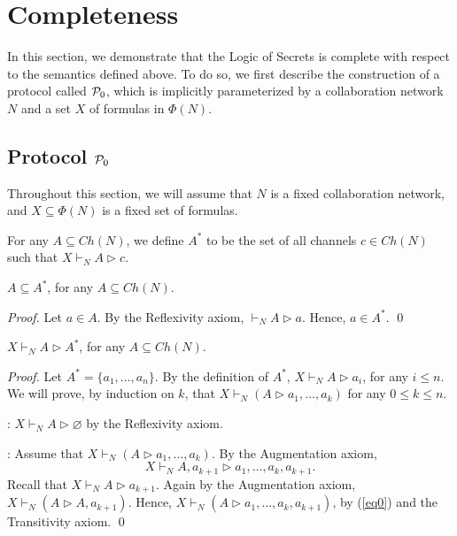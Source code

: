 \documentclass{llncs}
\newcommand{\pp}{{\cal P}}
\begin{document}
\section{Completeness}
In this section, we demonstrate that the Logic of Secrets is complete with respect to the semantics defined above.  To do so, we first describe the construction of a protocol called $\pp_0$, which is implicitly parameterized by a collaboration network $N$ and a set $X$ of formulas in $\Phi(N)$.


\subsection{Protocol $\pp_0$}
Throughout this section, we will assume that $N$ is a fixed collaboration network, and $X \subseteq \Phi(N)$ is a fixed set of formulas.

\begin{definition}\label{control closure}
For any $A\subseteq Ch(N)$, we define $A^*$ to be the set of all channels $c\in Ch(N)$ such that $X\vdash_N A\rhd c$.
\end{definition}



\begin{theorem}\label{AsubA*}
$A\subseteq A^*$, for any $A\subseteq Ch(N)$.
\end{theorem}
\begin{proof}
Let $a\in A$. By the Reflexivity axiom, $\vdash_N A\rhd a$. Hence, $a\in A^*$.
\qed \end{proof}

\begin{theorem}\label{ArhdA*}
$X\vdash_N A\rhd A^*$, for any $A\subseteq Ch(N)$.
\end{theorem}
\begin{proof}
Let $A^*=\{a_1,\dots,a_n\}$. By the definition of $A^*$,  $X\vdash_N A\rhd a_i$, for any $i\le n$. We will
prove, by induction on $k$, that $X\vdash_N (A\rhd a_1,\dots,a_k)$ for any $0\le k\le n$. 

: $X\vdash_N A\rhd \varnothing$ by the Reflexivity axiom.

: Assume that $X\vdash_N (A\rhd a_1,\dots,a_k)$. By the Augmentation axiom, 
\begin{equation}\label{eq0}
X\vdash_N A, a_{k+1}\rhd a_1,\dots,a_k,a_{k+1}.
\end{equation}
Recall that $X\vdash_N A\rhd a_{k+1}$. Again by the Augmentation axiom, $X\vdash_N (A\rhd A, a_{k+1})$.
Hence, $X\vdash_N (A \rhd a_1,\dots,a_k,a_{k+1})$, by (\ref{eq0}) and the Transitivity axiom.
\qed \end{proof}
\end{document}
